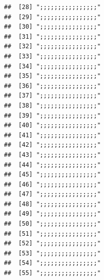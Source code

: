 \documentclass[
]{article}
\begin{document}
\begin{verbatim}
##  [28] ";;;;;;;;;;;;;;;;"                                                                    
##  [29] ";;;;;;;;;;;;;;;;"                                                                    
##  [30] ";;;;;;;;;;;;;;;;"                                                                    
##  [31] ";;;;;;;;;;;;;;;;"                                                                    
##  [32] ";;;;;;;;;;;;;;;;"                                                                    
##  [33] ";;;;;;;;;;;;;;;;"                                                                    
##  [34] ";;;;;;;;;;;;;;;;"                                                                    
##  [35] ";;;;;;;;;;;;;;;;"                                                                    
##  [36] ";;;;;;;;;;;;;;;;"                                                                    
##  [37] ";;;;;;;;;;;;;;;;"                                                                    
##  [38] ";;;;;;;;;;;;;;;;"                                                                    
##  [39] ";;;;;;;;;;;;;;;;"                                                                    
##  [40] ";;;;;;;;;;;;;;;;"                                                                    
##  [41] ";;;;;;;;;;;;;;;;"                                                                    
##  [42] ";;;;;;;;;;;;;;;;"                                                                    
##  [43] ";;;;;;;;;;;;;;;;"                                                                    
##  [44] ";;;;;;;;;;;;;;;;"                                                                    
##  [45] ";;;;;;;;;;;;;;;;"                                                                    
##  [46] ";;;;;;;;;;;;;;;;"                                                                    
##  [47] ";;;;;;;;;;;;;;;;"                                                                    
##  [48] ";;;;;;;;;;;;;;;;"                                                                    
##  [49] ";;;;;;;;;;;;;;;;"                                                                    
##  [50] ";;;;;;;;;;;;;;;;"                                                                    
##  [51] ";;;;;;;;;;;;;;;;"                                                                    
##  [52] ";;;;;;;;;;;;;;;;"                                                                    
##  [53] ";;;;;;;;;;;;;;;;"                                                                    
##  [54] ";;;;;;;;;;;;;;;;"                                                                    
##  [55] ";;;;;;;;;;;;;;;;"                                                                    

\end{verbatim}
\end{document}
